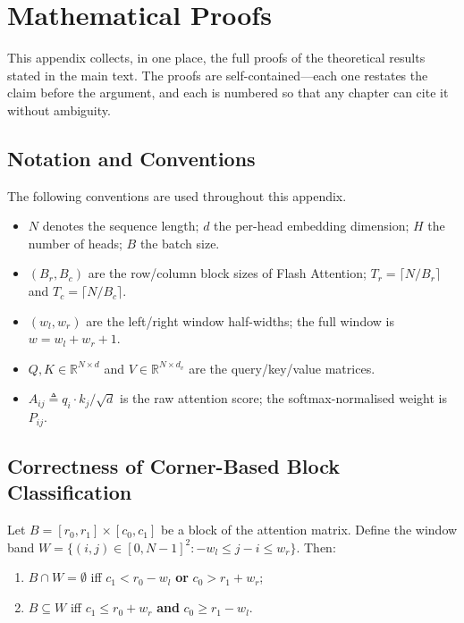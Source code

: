 \chapter{Mathematical Proofs}
\label{chp:appB}

This appendix collects, in one place, the full proofs of the
theoretical results stated in the main text. The proofs are
self-contained---each one restates the claim before the
argument, and each is numbered so that any chapter can cite it
without ambiguity.

\section{Notation and Conventions}\label{app:notation}
The following conventions are used throughout this appendix.
\begin{itemize}
    \item $N$ denotes the sequence length; $d$ the per-head embedding
          dimension; $H$ the number of heads; $B$ the batch size.
    \item $(B_r, B_c)$ are the row/column block sizes of Flash
          Attention; $T_r = \lceil N/B_r \rceil$ and
          $T_c = \lceil N/B_c \rceil$.
    \item $(w_l, w_r)$ are the left/right window half-widths; the full
          window is $w = w_l + w_r + 1$.
    \item $Q, K \in \mathbb{R}^{N \times d}$ and $V \in \mathbb{R}^{N
          \times d_v}$ are the query/key/value matrices.
    \item $A_{ij} \triangleq q_i \cdot k_j / \sqrt{d}$ is the raw
          attention score; the softmax-normalised weight is $P_{ij}$.
\end{itemize}

\section{Correctness of Corner-Based Block
Classification}\label{app:proofs_classify}

\begin{lemma}\label{lem:corner2}
Let $B = [r_0, r_1] \times [c_0, c_1]$ be a block of the attention
matrix. Define the window band
$W = \{(i,j) \in [0, N-1]^2 : -w_l \le j - i \le w_r\}$.
Then:
\begin{enumerate}
    \item[\textup{(i)}] $B \cap W = \emptyset$ iff
          $c_1 < r_0 - w_l$ \textbf{or} $c_0 > r_1 + w_r$;
    \item[\textup{(ii)}] $B \subseteq W$ iff
          $c_1 \le r_0 + w_r$ \textbf{and} $c_0 \ge r_1 - w_l$.
\end{enumerate}
\end{lemma}

